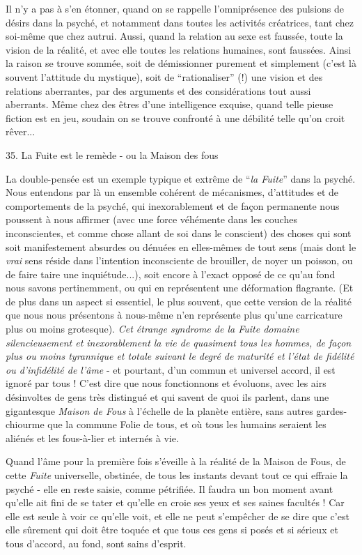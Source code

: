 Il n'y a pas à s'en étonner, quand on se rappelle l'omniprésence des pulsions de désirs dans la psyché, et notamment dans toutes les activités créatrices, tant chez soi-même que chez autrui. Aussi, quand la relation au sexe est faussée, toute la vision de la réalité, et avec elle toutes les relations humaines, sont faussées. Ainsi la raison se trouve sommée, soit de démissionner purement et simplement (c'est là souvent l'attitude du mystique), soit de ``rationaliser'' (!) une vision et des relations aberrantes, par des arguments et des considérations tout aussi aberrants. Même chez des êtres d'une intelligence exquise, quand telle pieuse fiction est en jeu, soudain on se trouve confronté à une débilité telle qu'on croit rêver...

35. La Fuite est le remède - ou la Maison des fous

La double-pensée est un exemple typique et extrême de ``\textit{la Fuite}'' dans la psyché. Nous entendons par là un ensemble cohérent de mécanismes, d'attitudes et de comportements de la psyché, qui inexorablement et de façon permanente nous poussent à nous affirmer (avec une force véhémente dans les couches inconscientes, et comme chose allant de soi dans le conscient) des choses qui sont soit manifestement absurdes ou dénuées en elles-mêmes de tout sens (mais dont le \textit{vrai} sens réside dans l'intention inconsciente de brouiller, de noyer un poisson, ou de faire taire une inquiétude...), soit encore à l'exact opposé de ce qu'au fond nous savons pertinemment, ou qui en représentent une déformation flagrante. (Et de plus dans un aspect si essentiel, le plus souvent, que cette version de la réalité que nous nous présentons à nous-même n'en représente plus qu'une carricature plus ou moins grotesque). \textit{Cet étrange syndrome de la Fuite domaine silencieusement et inexorablement la vie de quasiment tous les hommes, de façon plus ou moins tyrannique et totale suivant le degré de maturité et l'état de fidélité ou d'infidélité de l'âme} - et pourtant, d'un commun et universel accord, il est ignoré par tous ! C'est dire que nous fonctionnons et évoluons, avec les airs désinvoltes de gens très distingué et qui savent de quoi ils parlent, dans une gigantesque \textit{Maison de Fous} à l'échelle de la planète entière, sans autres gardes-chiourme que la commune Folie de tous, et où tous les humains seraient les aliénés et les fous-à-lier et internés à vie.

Quand l'âme pour la première fois s'éveille à la réalité de la Maison de Fous, de cette \textit{Fuite} universelle, obstinée, de tous les instants devant tout ce qui effraie la psyché - elle en reste saisie, comme pétrifiée. Il faudra un bon moment avant qu'elle ait fini de se tater et qu'elle en croie ses yeux et ses saines facultés ! Car elle est seule à voir ce qu'elle voit, et elle ne peut s'empêcher de se dire que c'est elle sûrement qui doit être toquée et que tous ces gens si posés et si sérieux et tous d'accord, au fond, sont sains d'esprit.

